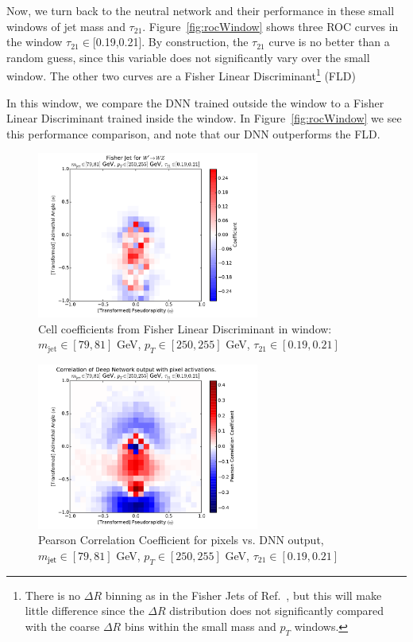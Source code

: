 Now, we turn back to the neutral network and their performance in these small windows of jet mass and $\tau_{21}$.    Figure~\ref{fig:rocWindow} shows three ROC curves in the window $\tau_{21} \in$[0.19,0.21].  By construction, the $\tau_{21}$ curve is no better than a random guess, since this variable does not significantly vary over the small window.  The other two curves are a Fisher Linear Discriminant\footnote{There is no $\Delta R$ binning as in the Fisher Jets of Ref.~\cite{Cogan:2014oua}, but this will make little difference since the $\Delta R$ distribution does not significantly compared with the coarse $\Delta R$ bins within the small mass and $p_T$ windows.} (FLD)

In this window, we compare the DNN trained outside the window to a Fisher Linear Discriminant trained inside the window. In Figure~\ref{fig:rocWindow} we see this performance comparison, and note that our DNN outperforms the FLD.

\begin{figure}[htbp]
  \centering
  \includegraphics[width=0.65\textwidth]{figures/fld-benwindow.pdf}
  \caption{Cell coefficients from Fisher Linear Discriminant in window: $m_\text{jet}\in [79, 81]$ GeV, $p_{T}\in [250, 255]$ GeV, $\tau_{21}\in[0.19, 0.21]$}
  \label{fig:fldWindow}
\end{figure}

\begin{figure}[htbp]
  \centering
  \includegraphics[width=0.65\textwidth]{figures/pixel-activations-corr-benwindow.pdf}
  \caption{Pearson Correlation Coefficient for pixels vs. DNN output, $m_{\mathsf{jet}}\in [79, 81]$ GeV, $p_{T}\in [250, 255]$ GeV, $\tau_{21}\in[0.19, 0.21]$}
  \label{fig:corrWindow}
\end{figure}

